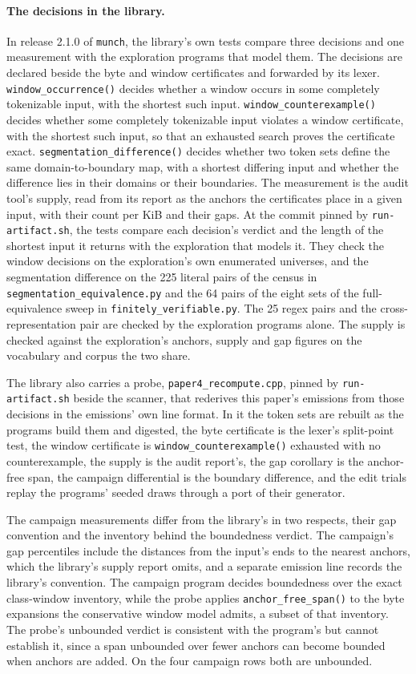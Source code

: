 \documentclass[11pt,a4paper]{article}
\theoremstyle{definition}
\theoremstyle{plain}
\newcommand{\code}[1]{\texttt{#1}}
\begin{document}
\paragraph{The decisions in the library.} In release 2.1.0 of \code{munch}, the library's own tests compare three
decisions and one measurement with the exploration programs that model them. The decisions are declared beside the byte
and window certificates and forwarded by its lexer. \code{window\_occurrence()} decides whether a window occurs in some
completely tokenizable input, with the shortest such input. \code{window\_counterexample()} decides whether some
completely tokenizable input violates a window certificate, with the shortest such input, so that an exhausted search
proves the certificate exact. \code{segmentation\_difference()} decides whether two token sets define the same
domain-to-boundary map, with a shortest differing input and whether the difference lies in their domains or their
boundaries. The measurement is the audit tool's supply, read from its report as the anchors the certificates place in a
given input, with their count per KiB and their gaps. At the commit pinned by \code{run-artifact.sh}, the tests compare
each decision's verdict and the length of the shortest input it returns with the exploration that models it. They check
the window decisions on the exploration's own enumerated universes, and the segmentation difference on the 225 literal
pairs of the census in \code{segmentation\_equivalence.py} and the 64 pairs of the eight sets of the full-equivalence
sweep in \code{finitely\_verifiable.py}. The 25 regex pairs and the cross-representation pair are checked by the
exploration programs alone. The supply is checked against the exploration's anchors, supply and gap figures on the
vocabulary and corpus the two share.

The library also carries a probe, \code{paper4\_recompute.cpp}, pinned by \code{run-artifact.sh} beside the scanner,
that rederives this paper's emissions from those decisions in the emissions' own line format. In it the token sets are
rebuilt as the programs build them and digested, the byte certificate is the lexer's split-point test, the window
certificate is \code{window\_counterexample()} exhausted with no counterexample, the supply is the audit report's, the
gap corollary is the anchor-free span, the campaign differential is the boundary difference, and the edit trials replay
the programs' seeded draws through a port of their generator.

The campaign measurements differ from the library's in two respects, their gap convention and the inventory behind the
boundedness verdict. The campaign's gap percentiles include the distances from the input's ends to the nearest anchors,
which the library's supply report omits, and a separate emission line records the library's convention. The campaign
program decides boundedness over the exact class-window inventory, while the probe applies \code{anchor\_free\_span()}
to the byte expansions the conservative window model admits, a subset of that inventory. The probe's unbounded verdict
is consistent with the program's but cannot establish it, since a span unbounded over fewer anchors can become bounded
when anchors are added. On the four campaign rows both are unbounded.
\end{document}
